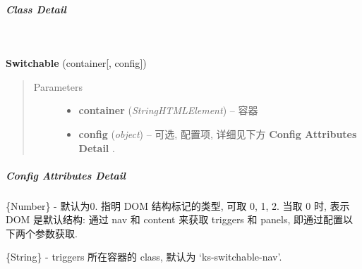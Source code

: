 \documentclass[letterpaper,10pt,english]{sphinxmanual}
\begin{document}
\subparagraph{Class Detail}
\label{api/component/switchable/switchable:class-detail}

\begin{fulllineitems}
\label{api/component/switchable/switchable:Switchable.Switchable}~
\begin{DUlineblock}{0em}
\item[] \textbf{Switchable} (container{[}, config{]})
\end{DUlineblock}
\begin{quote}\begin{description}
\item[{Parameters}] \leavevmode\begin{itemize}
\item {}
\textbf{container} (\emph{String\textbar{}HTMLElement}) -- 容器

\item {}
\textbf{config} (\emph{object}) -- 可选, 配置项, 详细见下方 \textbf{Config Attributes Detail} .

\end{itemize}

\end{description}\end{quote}

\end{fulllineitems}



\subparagraph{Config Attributes Detail}
\label{api/component/switchable/switchable:config-attributes-detail}

\begin{fulllineitems}
\label{api/component/switchable/switchable:Switchable.markupType}
\{Number\} - 默认为0. 指明 DOM 结构标记的类型, 可取 0, 1, 2. 当取 0 时, 表示 DOM 是默认结构: 通过 nav 和 content 来获取 triggers 和 panels, 即通过配置以下两个参数获取.

\end{fulllineitems}



\begin{fulllineitems}
\label{api/component/switchable/switchable:Switchable.navCls}
\{String\} - triggers 所在容器的 class, 默认为 `ks-switchable-nav'.

\end{fulllineitems}
\end{document}
